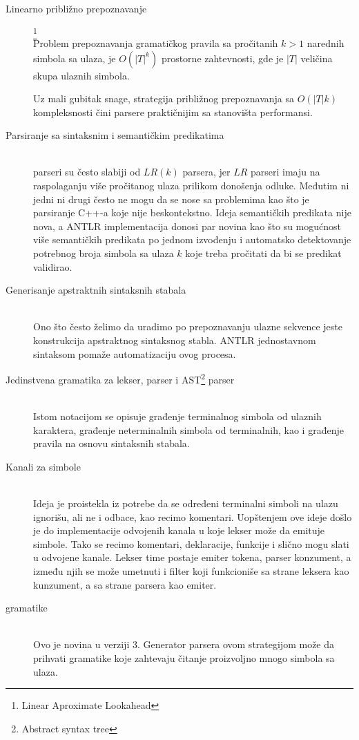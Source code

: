 \begin{description}

	\item[Linearno približno prepoznavanje]\footnote{\eng Linear Aproximate Lookahead} \hfill \\
	Problem prepoznavanja gramatičkog pravila sa pročitanih $k > 1$ narednih simbola sa ulaza, je $O(|T|^{k})$ prostorne zahtevnosti, gde je $|T|$ veličina skupa ulaznih simbola. 
	
	Uz mali gubitak snage, strategija približnog prepoznavanja sa $O(|T|k)$ kompleksnosti čini \LLk parsere praktičnijim sa stanovišta performansi.
	\item[Parsiranje sa sintaksnim i semantičkim predikatima] \hfill \\
	\LLk parseri su često slabiji od $LR(k)$ parsera, jer $LR$ parseri imaju na raspolaganju više pročitanog ulaza prilikom donošenja odluke.
	Međutim ni jedni ni drugi često ne mogu da se nose sa problemima kao što je parsiranje C++-a koje nije beskontekstno.
	Ideja semantičkih predikata nije nova\cite{attributed-translations}, a ANTLR implementacija donosi par novina kao što su mogućnost više  semantičkih predikata po jednom izvođenju i automatsko detektovanje potrebnog broja simbola sa ulaza $k$ koje treba pročitati da bi se predikat validirao.

	\item[Generisanje apstraktnih sintaksnih stabala] \hfill \\
	Ono što često želimo da uradimo po prepoznavanju ulazne sekvence jeste konstrukcija apstraktnog sintaksnog stabla. ANTLR jednostavnom sintaksom pomaže automatizaciju ovog procesa.
	\item[Jedinstvena gramatika za lekser, parser i AST\footnote{\skr \eng Abstract syntax tree}  parser] \hfill \\
	Istom notacijom se opisuje građenje terminalnog simbola od ulaznih karaktera, građenje neterminalnih simbola od terminalnih, kao i građenje pravila na osnovu sintaksnih stabala.
	\item[Kanali za simbole] \hfill \\
	Ideja je proistekla iz potrebe da se određeni terminalni simboli na ulazu ignorišu, ali ne i odbace, kao recimo komentari. 
Uopštenjem ove ideje došlo je do implementacije odvojenih kanala u koje lekser može da emituje simbole. Tako se recimo komentari, deklaracije, funkcije i slično mogu slati u odvojene kanale. 
Lekser time postaje emiter tokena, parser konzument, a između njih se može umetnuti i filter koji funkcioniše sa strane leksera kao kunzument, a sa strane parsera kao emiter.
	\item [\LLa gramatike] \hfill \\
	Ovo je novina u verziji 3. Generator parsera ovom strategijom može da prihvati gramatike koje zahtevaju čitanje proizvoljno mnogo simbola sa ulaza.

\end{description}

